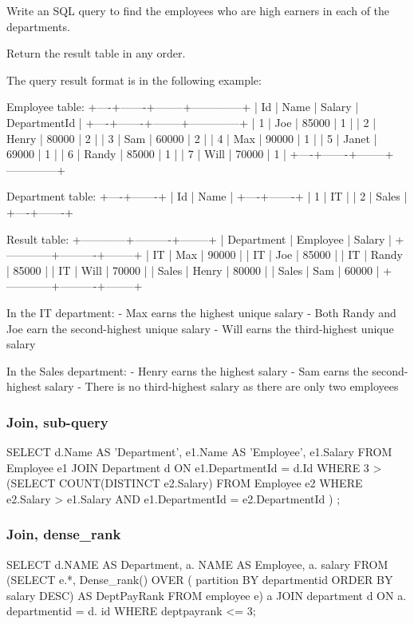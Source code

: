 Write an SQL query to find the employees who are high earners in each of the departments.

Return the result table in any order.

The query result format is in the following example:
\begin{Code}
Employee table:
+----+-------+--------+--------------+
| Id | Name  | Salary | DepartmentId |
+----+-------+--------+--------------+
| 1  | Joe   | 85000  | 1            |
| 2  | Henry | 80000  | 2            |
| 3  | Sam   | 60000  | 2            |
| 4  | Max   | 90000  | 1            |
| 5  | Janet | 69000  | 1            |
| 6  | Randy | 85000  | 1            |
| 7  | Will  | 70000  | 1            |
+----+-------+--------+--------------+

Department table:
+----+-------+
| Id | Name  |
+----+-------+
| 1  | IT    |
| 2  | Sales |
+----+-------+

Result table:
+------------+----------+--------+
| Department | Employee | Salary |
+------------+----------+--------+
| IT         | Max      | 90000  |
| IT         | Joe      | 85000  |
| IT         | Randy    | 85000  |
| IT         | Will     | 70000  |
| Sales      | Henry    | 80000  |
| Sales      | Sam      | 60000  |
+------------+----------+--------+

In the IT department:
- Max earns the highest unique salary
- Both Randy and Joe earn the second-highest unique salary
- Will earns the third-highest unique salary

In the Sales department:
- Henry earns the highest salary
- Sam earns the second-highest salary
- There is no third-highest salary as there are only two employees
\end{Code}

\subsubsection{Join, sub-query}
\begin{Code}
SELECT
    d.Name AS 'Department', e1.Name AS 'Employee', e1.Salary
FROM
    Employee e1
        JOIN
    Department d ON e1.DepartmentId = d.Id
WHERE
    3 > (SELECT
            COUNT(DISTINCT e2.Salary)
        FROM
            Employee e2
        WHERE
            e2.Salary > e1.Salary
                AND e1.DepartmentId = e2.DepartmentId
        )
;
\end{Code}

\subsubsection{Join, dense_rank}
\begin{Code}
SELECT d.NAME  AS Department,
       a. NAME AS Employee,
       a. salary
FROM   (SELECT e.*,
               Dense_rank()
                 OVER (
                   partition BY departmentid
                   ORDER BY salary DESC) AS DeptPayRank
        FROM   employee e) a
       JOIN department d
         ON a. departmentid = d. id
WHERE  deptpayrank <= 3; 
\end{Code}


